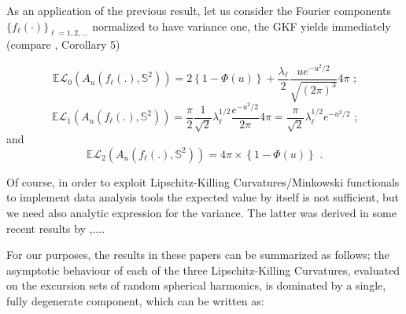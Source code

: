 \documentclass[aps,prd,showpacs,superscriptaddress,groupedaddress]{revtex4-1}  %
\begin{document}
As an application of the previous result, let us consider the Fourier components $\{f_\ell(\cdot)\}_{\ell=1,2,\dots}$ normalized to have variance one, the GKF yields immediately (compare
\cite{MarVad}, Corollary 5)%

\begin{equation}
\mathbb{E}\mathcal{L}_{0}(A_{u}(f_{\ell }(.),\mathbb{S}^{2}))=2\left\{ 1-\Phi
(u)\right\} +\frac{\lambda_{\ell}}{2}\frac{ue^{-u^{2}/2}}{\sqrt{(2\pi )^{3}}}%
4\pi \text{ ;}  \label{sh1}
\end{equation}
\begin{equation}
\mathbb{E}\mathcal{L}_{1}(A_{u}(f_{\ell }(.),\mathbb{S}^{2})) =\frac{\pi }{2}%
\frac{1}{\sqrt{2}}\lambda_{\ell}^{1/2}\frac{e^{-u^{2}/2}}{2\pi }%
4\pi=\frac{\pi}{\sqrt{2}} \lambda_{\ell}^{1/2}e^{-u^{2}/2}\text{ ;} \label{sh2}
\end{equation}
and%
\begin{equation}
\mathbb{E}\mathcal{L}_{2}(A_{u}(f_{\ell }(.),\mathbb{S}^{2}))=4\pi \times \left\{
1-\Phi (u)\right\} \text{ .}  \label{sh3}
\end{equation}

Of course, in order to exploit Lipschitz-Killing Curvatures/Minkowski functionals to implement data analysis tools the expected value by itself is not sufficient, but we need also analytic expression for the variance. The latter was derived in some recent results by \cite{CMW-EPC},....

For our purposes, the results in these papers can be summarized as follows; the asymptotic behaviour of each of the three Lipschitz-Killing Curvatures, evaluated on the excursion sets of random spherical harmonics, is dominated by a single, fully degenerate component, which can be written as:
\end{document}
